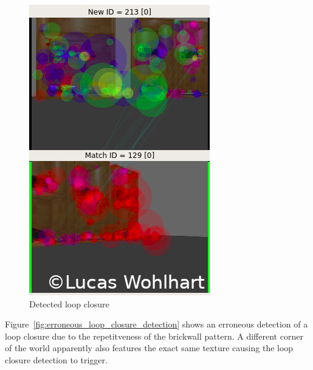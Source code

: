 \documentclass[10pt,journal,compsoc]{IEEEtran}
\begin{document}
\begin{figure}[thpb]
      \centering
      \includegraphics[width=0.65\linewidth]{img/factory_loop_closure.png}
      \caption{Detected loop closure}
      \label{fig:factory_loop_closure}
\end{figure}


Figure~\ref{fig:erroneous_loop_closure_detection} shows an erroneous detection of a loop closure due to the repetitveness of the brickwall pattern. A different corner of the world apparently also features the exact same texture causing the loop closure detection to trigger.
\end{document}

